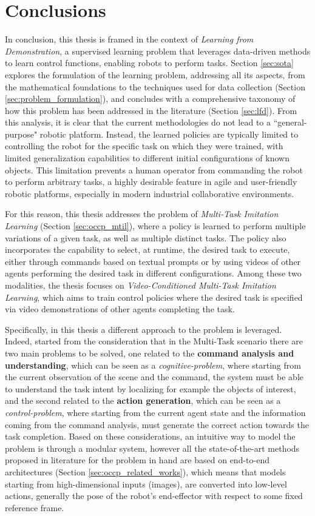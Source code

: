 \chapter{Conclusions}
\label{sec:conclusion}
In conclusion, this thesis is framed in the context of \textit{Learning from Demonstration}, a supervised learning problem that leverages data-driven methods to learn control functions, enabling robots to perform tasks. Section \ref{sec:sota} explores the formulation of the learning problem, addressing all its aspects, from the mathematical foundations to the techniques used for data collection (Section \ref{sec:problem_formulation}), and concludes with a comprehensive taxonomy of how this problem has been addressed in the literature (Section \ref{sec:lfd}). From this analysis, it is clear that the current methodologies do not lead to a ``general-purpose" robotic platform. Instead, the learned policies are typically limited to controlling the robot for the specific task on which they were trained, with limited generalization capabilities to different initial configurations of known objects. This limitation prevents a human operator from commanding the robot to perform arbitrary tasks, a highly desirable feature in agile and user-friendly robotic platforms, especially in modern industrial collaborative environments.

For this reason, this thesis addresses the problem of \textit{Multi-Task Imitation Learning} (Section \ref{sec:occp_mtil}), where a policy is learned to perform multiple variations of a given task, as well as multiple distinct tasks. The policy also incorporates the capability to select, at runtime, the desired task to execute, either through commands based on textual prompts or by using videos of other agents performing the desired task in different configurations. Among these two modalities, the thesis focuses on \textit{Video-Conditioned Multi-Task Imitation Learning}, which aims to train control policies where the desired task is specified via video demonstrations of other agents completing the task.

Specifically, in this thesis a different approach to the problem is leveraged. Indeed, started from the consideration that in the Multi-Task scenario there are two main problems to be solved, one related to the \textbf{command analysis and understanding}, which can be seen as a \textit{cognitive-problem}, where starting from the current observation of the scene and the command, the system must be able to understand the task intent by localizing for example the objects of interest, and the second related to the \textbf{action generation}, which can be seen as a \textit{control-problem}, where starting from the current agent state and the information coming from the command analysis, must generate the correct action towards the task completion. Based on these considerations, an intuitive way to model the problem is through a modular system, however all the state-of-the-art methods proposed in literature for the problem in hand are based on end-to-end architectures (Section \ref{sec:occp_related_works}), which means that models starting from high-dimensional inputs (images), are converted into low-level actions, generally the pose of the robot's end-effector with respect to some fixed reference frame. 

